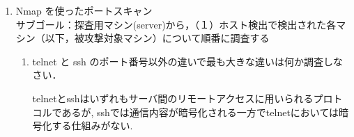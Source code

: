 \begin{enumerate}[label=(\arabic*.),leftmargin=*]
\begin{enumerate}[label=\arabic*, leftmargin=*]
            \quad
            図\ref{fig:nmap_ping_scan_result_dns_icmp}から, 
            No.1のパケットのDNS $\rightarrow$ Transaction\,IDの値が, 
            No.5のパケットのICMP $\rightarrow$ DNS $\rightarrow$ Transaction\,ID
            の値が一致しており, 
            transactionIDが一致しているため, 
            このパケットは図\ref{fig:nmap_ping_scan_result_dns_icmp}のDNS問い合わせに対する応答であることがわかる.\\
            \quad
            また, No.5のパケットの
            ICMP $\rightarrow$ DNS $\rightarrow$ Queries 
            において
            Nameが1.100.168.192.in-addr.arpa,\,
            TypeがPTR(Domain\, name\, PoinTeR)
            であることが確認できる.
            DNS逆引きにおいてはドメイン名とタイプがそれぞれ,
             [逆順IP].IN-ADDR.ARPA, PTR
            になるため\cite{rfc1035},
            これはDNS逆引きのためのDNSパケットであることがわかる.
            今回は-nオプション(DNS解決を行わない)を指定していないため,
            DNS逆引きを試みている\cite{nmap_man_host_discovery}.\\
            \quad
            さらに, ICMPのTypeが3でCodeが3であることから,
            ポート到達不能によるICMP到達不能メッセージであることがわかる.\\
            \quad
            以上の解析から, pingスキャンの実行に伴い,
            まずARPリクエストが探索範囲に対して送信され,
            ARP応答が返されたIPのみが利用可能なホストとして検出されたこと,
            またその過程においてDNS逆引きを試みるパケットが流れていることが確認できた.
            今回はroot権限で同一セグメント上のホストにのみpingスキャンを行ったため,
            このような結果が得られたと考えられる.

            \vspace{\baselineskip}
    \end{enumerate}

    \vspace{0.5cm}
    \item Nmap を使ったポートスキャン \\
    サブゴール：探査用マシン(server)から，（１）ホスト検出で検出された各マシン（以下，被攻撃対象マシン）について順番に調査する
    \begin{enumerate}[label=\arabic*., leftmargin=*]
        \item telnet と ssh のポート番号以外の違いで最も大きな違いは何か調査しなさい．
        
            \vspace{\baselineskip}
            \quad
            telnetとsshはいずれもサーバ間のリモートアクセスに用いられるプロトコルであるが, sshでは通信内容が暗号化される一方でtelnetにおいては暗号化する仕組みがない\cite{telnet_ssh}.
            \vspace{\baselineskip}


\end{enumerate}
\end{enumerate}
